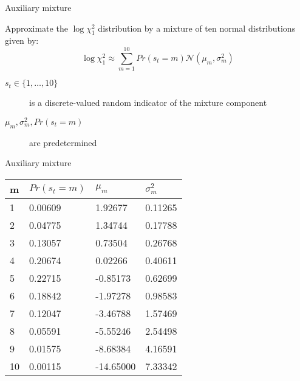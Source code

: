 \documentclass[notes,blackandwhite,mathsans,usenames,dvipsnames]{beamer}
\begin{document}
\begin{frame}{Auxiliary mixture}

{\color{mcxs2}Approximate the} $\log\chi^2_1$ {\color{mcxs2}distribution by a} {\color{purple}mixture of ten normal distributions} {\color{mcxs2}given by:}
$$
\log\chi_1^2 \approx \sum_{m=1}^{10} Pr(s_t=m)\mathcal{N}\left( \mu_m, \sigma^2_m \right)
$$

\bigskip\begin{description}
\item[$s_t \in\{1,\dots, 10\}$] {\color{mcxs2}is a discrete-valued random indicator of the mixture  component}
\item[$\mu_m,\sigma^2_m, Pr(s_t=m)$] {\color{mcxs2}are predetermined}
\end{description}
\end{frame}







\begin{frame}{Auxiliary mixture}
\centering
\begin{tabular}{llll}
\toprule
m & $Pr(s_{t}=m)$ & $\mu_m$ & $\sigma^{2}_m$ \\ 
\midrule
1  & 0.00609                                    & 1.92677              & 0.11265                  \\
2  & 0.04775                                    & 1.34744              & 0.17788                  \\
3  & 0.13057                                    & 0.73504              & 0.26768                  \\
4  & 0.20674                                    & 0.02266              & 0.40611                  \\
5  & 0.22715                                    & -0.85173             & 0.62699                  \\
6  & 0.18842                                    & -1.97278             & 0.98583                  \\
7  & 0.12047                                    & -3.46788             & 1.57469                  \\
8  & 0.05591                                    & -5.55246             & 2.54498                  \\
9  & 0.01575                                    & -8.68384             & 4.16591                  \\
10 & 0.00115                                    & -14.65000            & 7.33342                  \\ 
\bottomrule
\end{tabular}
\end{frame}
\end{document}
